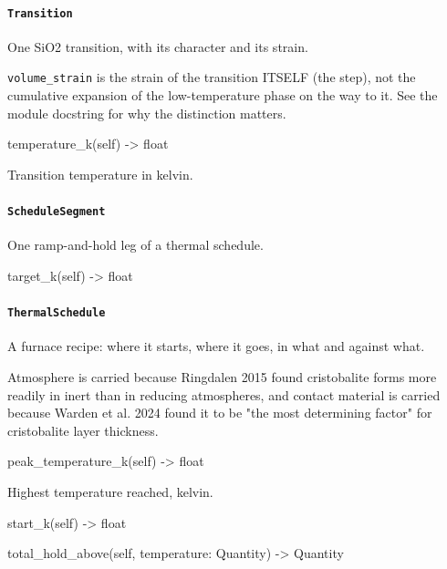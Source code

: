 \documentclass[10pt,a4paper,twoside]{report}
\begin{document}
\paragraph{\texttt{Transition}}

One SiO2 transition, with its character and its strain.

\texttt{volume\_strain} is the strain of the transition ITSELF (the step), not the cumulative expansion of the low-temperature phase on the way to it. See the module docstring for why the distinction matters.

\begin{verbatimsmall}
temperature_k(self) -> float
\end{verbatimsmall}

Transition temperature in kelvin.

\paragraph{\texttt{ScheduleSegment}}

One ramp-and-hold leg of a thermal schedule.

\begin{verbatimsmall}
target_k(self) -> float
\end{verbatimsmall}

\paragraph{\texttt{ThermalSchedule}}

A furnace recipe: where it starts, where it goes, in what and against what.

Atmosphere is carried because Ringdalen 2015 found cristobalite forms more readily in inert than in reducing atmospheres, and contact material is carried because Warden et al. 2024 found it to be "the most determining factor" for cristobalite layer thickness.

\begin{verbatimsmall}
peak_temperature_k(self) -> float
\end{verbatimsmall}

Highest temperature reached, kelvin.

\begin{verbatimsmall}
start_k(self) -> float
\end{verbatimsmall}

\begin{verbatimsmall}
total_hold_above(self, temperature: Quantity) -> Quantity
\end{verbatimsmall}
\end{document}
